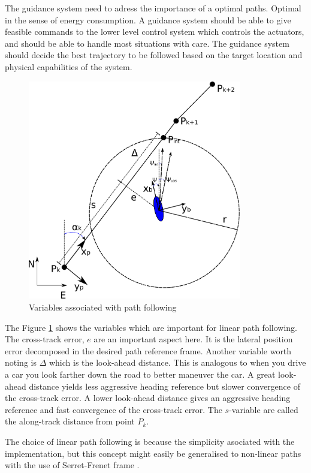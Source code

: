 	The guidance system need to adress the importance of a optimal paths. Optimal in the sense
	of energy consumption. A guidance system should be able to give 
	feasible commands to the lower level control system which controls the actuators, and should be able
	to handle most situations with care. The guidance system should decide the best trajectory to be
	followed based on the target location and physical capabilities of the system.\cite{GuidanceReview}

	\begin{figure}[hbtp]
		\centering
		\includegraphics[width=0.83\textwidth]{pics/waypoint}
		\caption{Variables associated with path following}
		\label{fig:ch2-pathfollowing}
	\end{figure}
	The Figure \ref{fig:ch2-pathfollowing} shows the variables which are important for linear path following. The
	cross-track error, $e$ are an important aspect here. It is the lateral position error decomposed in
	the desired path reference frame. Another variable worth noting is $\Delta$ which is the look-ahead
	distance. This is analogous to when you drive a car you look farther down the road to better maneuver
	the car. A great look-ahead distance yields less aggressive heading reference but slower convergence of the
	cross-track error. A lower look-ahead distance gives an aggressive heading reference and fast
	convergence of the cross-track error. The $s$-variable are called the along-track distance from point
	$P_k$. 

	The choice of linear path following is because the simplicity asociated with the implementation, but
	this concept might easily be generalised to non-linear paths with the use of Serret-Frenet frame
	\cite{modsim}.
	
